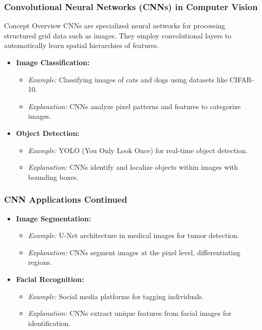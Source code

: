 \documentclass{beamer}
\begin{document}
\begin{frame}[fragile]
    \frametitle{Convolutional Neural Networks (CNNs) in Computer Vision}
    
    \begin{block}{Concept Overview}
        CNNs are specialized neural networks for processing structured grid data such as images. They employ convolutional layers to automatically learn spatial hierarchies of features.
    \end{block}

    \begin{itemize}
        \item \textbf{Image Classification:}
            \begin{itemize}
                \item \textit{Example:} Classifying images of cats and dogs using datasets like CIFAR-10.
                \item \textit{Explanation:} CNNs analyze pixel patterns and features to categorize images.
            \end{itemize}
        \item \textbf{Object Detection:}
            \begin{itemize}
                \item \textit{Example:} YOLO (You Only Look Once) for real-time object detection.
                \item \textit{Explanation:} CNNs identify and localize objects within images with bounding boxes.
            \end{itemize}
    \end{itemize}
    
\end{frame}

\begin{frame}[fragile]
    \frametitle{CNN Applications Continued}
    
    \begin{itemize}
        \item \textbf{Image Segmentation:}
            \begin{itemize}
                \item \textit{Example:} U-Net architecture in medical images for tumor detection.
                \item \textit{Explanation:} CNNs segment images at the pixel level, differentiating regions.
            \end{itemize}
        \item \textbf{Facial Recognition:}
            \begin{itemize}
                \item \textit{Example:} Social media platforms for tagging individuals.
                \item \textit{Explanation:} CNNs extract unique features from facial images for identification.
            \end{itemize}
    \end{itemize}
    
\end{frame}
\end{document}
